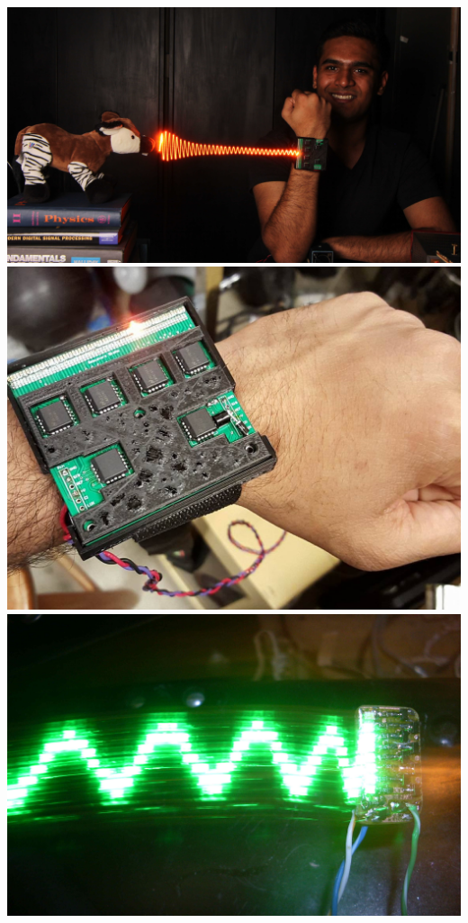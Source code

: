 \documentclass{sigchi-ext}
\begin{document}
\begin{marginfigure}[-35pc]
  \begin{minipage}{\marginparwidth}
 \includegraphics[width=\textwidth]{sarangs.jpg}\\
 \includegraphics[width=\textwidth]{microswims.jpg}\\
 \includegraphics[width=\textwidth]{SDC11632s.jpg}\\

\end{minipage}
\end{marginfigure}
\end{document}

